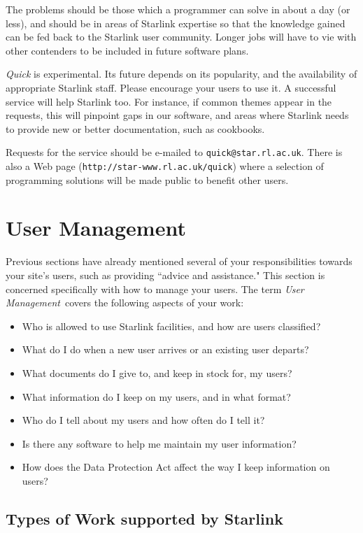 \documentclass[twoside,11pt]{article}
\begin{document}
The problems should be those which a programmer can solve in about
a day (or less), and should be in areas of Starlink expertise so that the
knowledge gained can be fed back to the Starlink user community.
Longer jobs will have to vie with other contenders to be included in future
software plans.

{\em Quick}\/ is experimental.
Its future depends on its popularity, and the availability of appropriate
Starlink staff. 
Please encourage your users to use it.
A successful service will help Starlink too.
For instance, if common themes appear in the requests, this will pinpoint
gaps in our software, and areas where Starlink needs to provide new or better
documentation, such as cookbooks.

Requests for the service should be e-mailed to {\tt quick@star.rl.ac.uk}.
There is also a Web page ({\tt http://star-www.rl.ac.uk/quick}) where a
selection of programming solutions will be made public to benefit
other users.

\newpage

\section {\label{usermanagement}User Management}

Previous sections have already mentioned several of your responsibilities
towards your site's users, such as providing ``advice and assistance."
This section is concerned specifically with how to manage your users.
The term {\em User Management}\, covers the following aspects of your work:
\begin{itemize}
\item Who is allowed to use Starlink facilities, and how are users
      classified?
\item What do I do when a new user arrives or an existing user departs?
\item What documents do I give to, and keep in stock for, my users?
\item What information do I keep on my users, and in what format?
\item Who do I tell about my users and how often do I tell it?
\item Is there any software to help me maintain my user information?
\item How does the Data Protection Act affect the way I keep information on
      users?
\end{itemize}

\subsection{\label{worktype}Types of Work supported by Starlink}
\end{document}
